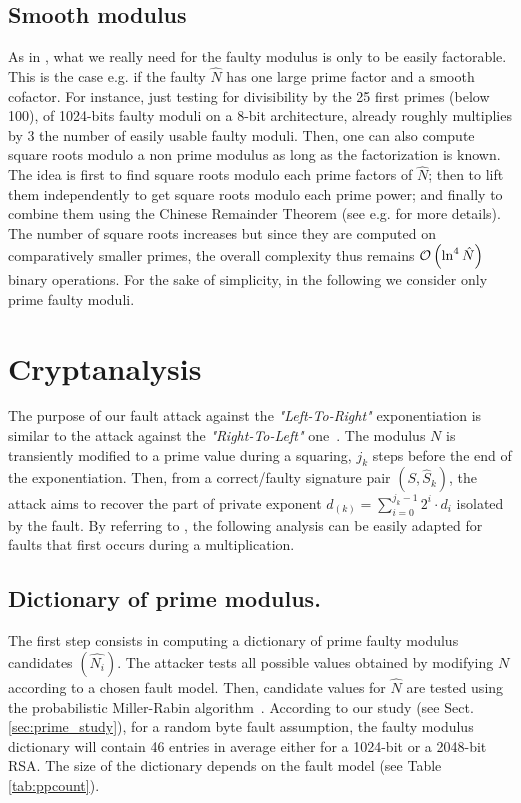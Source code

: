 \documentclass{article}
\begin{document}
\subsection{Smooth modulus}
As in \cite{13}, what we really need for the faulty modulus is only to
be easily factorable. This is the case e.g. if the faulty $\hat{N}$
has one large prime factor and a smooth cofactor.
For instance, just testing for divisibility by the 25 first primes
(below 100), of 1024-bits faulty moduli on a $8$-bit architecture,
already roughly multiplies by $3$ the number of easily usable faulty
moduli. 
Then, one can also compute square roots modulo a
non prime modulus as long as the factorization is known. The idea is
first to find square roots modulo each prime factors of
$\hat{N}$; then to lift them independently to get square roots modulo
each prime power; and finally to combine them using the Chinese
Remainder Theorem (see e.g. \cite[\S 13.3.3]{83} for more details). 
The number of square roots increases but since they are computed on
comparatively smaller primes, the overall complexity thus remains
${\cal O} \left( \ln^{4} \hat{N}\right)$ binary operations. 
For the sake of simplicity, in the following
we consider only prime faulty moduli.

\section{Cryptanalysis}
\label{sec:crypt}
The purpose of our fault attack against the \textit{"Left-To-Right"} exponentiation is similar to the attack against the \textit{"Right-To-Left"} one~\cite{77}. The modulus $N$ is transiently modified to a prime value during a squaring, $j_k$ steps before the end of the exponentiation. Then, from a correct/faulty signature pair $(S,\hat{S}_{k})$, the attack aims to recover the part of private exponent $d_{(k)} = \sum_{i=0}^{j_{k}-1} 2^i \cdot d_i$ isolated by the fault. By referring to \cite{77}, the following analysis can be easily adapted for faults that first occurs during a multiplication.

\subsection{Dictionary of prime modulus.}
The first step consists in computing a dictionary of prime faulty modulus candidates $(\hat{N_i})$. The attacker tests all possible values obtained by modifying $N$ according to a chosen fault model. Then, candidate values for $\hat{N}$ are tested using the probabilistic Miller-Rabin algorithm~\cite{81}. According to our study (see Sect. \ref{sec:prime_study}), for a random byte fault assumption, the faulty modulus dictionary will contain 46 entries in average either for a 1024-bit or a 2048-bit RSA. The size of the dictionary depends on the fault model (see Table \ref{tab:ppcount}).
\end{document}
